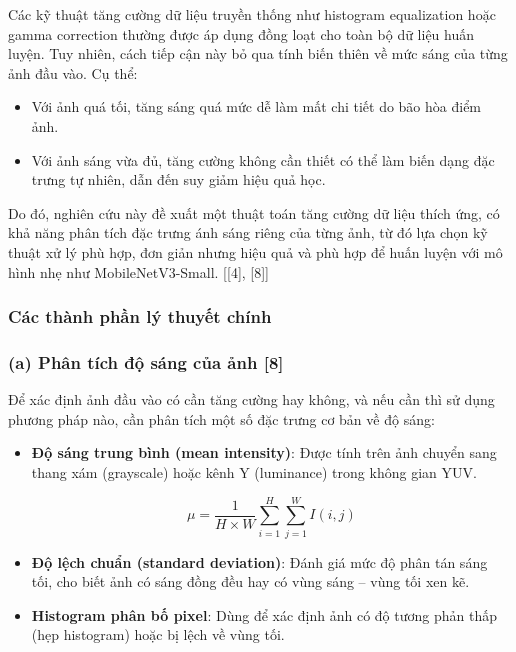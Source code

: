 Các kỹ thuật tăng cường dữ liệu truyền thống như histogram equalization hoặc gamma correction thường được áp dụng đồng loạt cho toàn bộ dữ liệu huấn luyện. Tuy nhiên, cách tiếp cận này bỏ qua tính biến thiên về mức sáng của từng ảnh đầu vào. Cụ thể:
\begin{itemize}[]
    \item Với ảnh quá tối, tăng sáng quá mức dễ làm mất chi tiết do bão hòa điểm ảnh.
    \item Với ảnh sáng vừa đủ, tăng cường không cần thiết có thể làm biến dạng đặc trưng tự nhiên, dẫn đến suy giảm hiệu quả học.
\end{itemize}

Do đó, nghiên cứu này đề xuất một thuật toán tăng cường dữ liệu thích ứng, có khả năng phân tích đặc trưng ánh sáng riêng của từng ảnh, từ đó lựa chọn kỹ thuật xử lý phù hợp, đơn giản nhưng hiệu quả và phù hợp để huấn luyện với mô hình nhẹ như MobileNetV3-Small. [[4], [8]]

\subsubsection{Các thành phần lý thuyết chính} %
\subsubsection*{(a) Phân tích độ sáng của ảnh [8]}

Để xác định ảnh đầu vào có cần tăng cường hay không, và nếu cần thì sử dụng phương pháp nào, cần phân tích một số đặc trưng cơ bản về độ sáng:


\begin{itemize}[]
    \item \textbf{Độ sáng trung bình (mean intensity)}: Được tính trên ảnh chuyển sang thang xám (grayscale) hoặc kênh Y (luminance) trong không gian YUV.
    
    \[ \mu = \frac{1}{H \times W} \sum_{i=1}^{H} \sum_{j=1}^{W} I(i,j) \]
    
    \item \textbf{Độ lệch chuẩn (standard deviation)}: Đánh giá mức độ phân tán sáng tối, cho biết ảnh có sáng đồng đều hay có vùng sáng -- vùng tối xen kẽ.
    \item \textbf{Histogram phân bố pixel}: Dùng để xác định ảnh có độ tương phản thấp (hẹp histogram) hoặc bị lệch về vùng tối.
\end{itemize}

